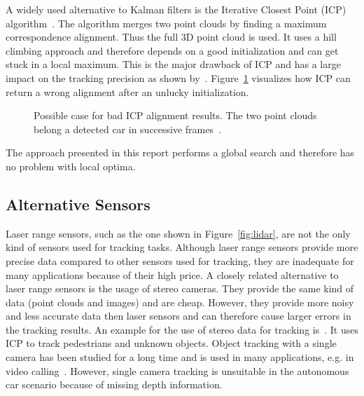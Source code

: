 \documentclass[twoside,a4paper,article]{combine}
\begin{document}
A widely used alternative to Kalman filters is the Iterative Closest
Point (ICP) algorithm~\cite{icp, icp2,
  leibe-tracking-before-detection}.
The algorithm merges
two point clouds by finding a maximum correspondence
alignment. Thus the full 3D point cloud is used. It
uses a hill climbing approach and therefore depends on a good
initialization and can get stuck in a local maximum. This is the major
drawback of ICP and has a large impact on the tracking precision as
shown by~\cite{icp-bad, icp-bad2}. Figure~\ref{fig:icp} visualizes how
ICP can return a wrong alignment after an unlucky initialization.
\begin{figure}
  \center
  
  \caption{Possible case for bad ICP alignment results. The two point
    clouds belong a detected car in successive frames~\cite{held-website}.}
  \label{fig:icp}
\end{figure}
The approach presented in this report performs a global search and
therefore has no problem with local optima.

\subsection{Alternative Sensors}
\label{sub:slternative-sensors}
Laser range sensors, such as the one shown in Figure~\ref{fig:lidar},
are not the only kind of sensors used for tracking tasks. Although
laser range sensors provide more precise data compared to other
sensors used for tracking, they are inadequate
for many applications because of their high price. A closely related
alternative to laser range sensors is the usage of stereo
cameras. They provide the same kind of data (point clouds and images)
and are cheap. However, they provide more noisy and less accurate data
then laser sensors and
can therefore cause larger errors in the tracking results. An example
for the use of stereo data for tracking
is~\cite{leibe-tracking-before-detection}. It uses ICP to track
pedestrians and unknown objects. Object tracking with a single camera
has been studied for a long time and is used in many applications,
e.g. in video calling~\cite{single-camera-tracking}. However, single
camera tracking is unsuitable in the autonomous car scenario because
of missing depth information.
\end{document}
